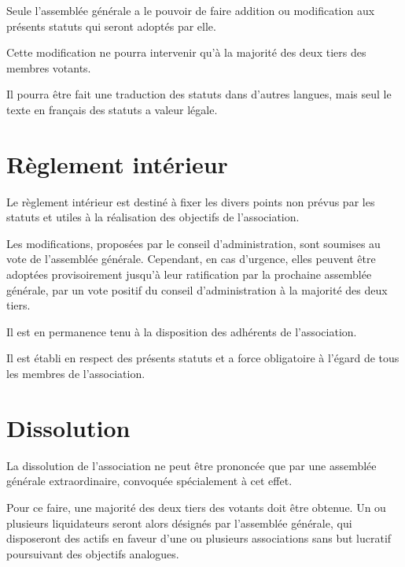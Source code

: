 \documentclass[a4wide,12pt]{scrartcl}
\begin{document}
Seule l'assemblée générale a le pouvoir de faire addition ou
modification aux présents statuts qui seront adoptés par elle.

Cette modification ne pourra intervenir qu'à la majorité des deux
tiers des membres votants.

Il pourra être fait une traduction des statuts dans d'autres langues,
mais seul le texte en français des statuts a valeur légale.

\section{Règlement intérieur}

Le règlement intérieur est destiné à fixer les divers points non
prévus par les statuts et utiles à la réalisation des objectifs de
l'association.

Les modifications, proposées par le conseil d'administration, sont
soumises au vote de l'assemblée générale. Cependant, en cas d'urgence,
elles peuvent être adoptées provisoirement jusqu'à leur ratification
par la prochaine assemblée générale, par un vote positif du conseil
d'administration à la majorité des deux tiers.

Il est en permanence tenu à la disposition des adhérents de
l'association.

Il est établi en respect des présents statuts et a force obligatoire à
l'égard de tous les membres de l'association.

\section{Dissolution}

La dissolution de l'association ne peut être prononcée que par une
assemblée générale extraordinaire, convoquée spécialement à cet effet.

Pour ce faire, une majorité des deux tiers des votants doit être
obtenue. Un ou plusieurs liquidateurs seront alors désignés par
l'assemblée générale, qui disposeront des actifs en faveur d'une ou
plusieurs associations sans but lucratif poursuivant des objectifs
analogues.
\end{document}
